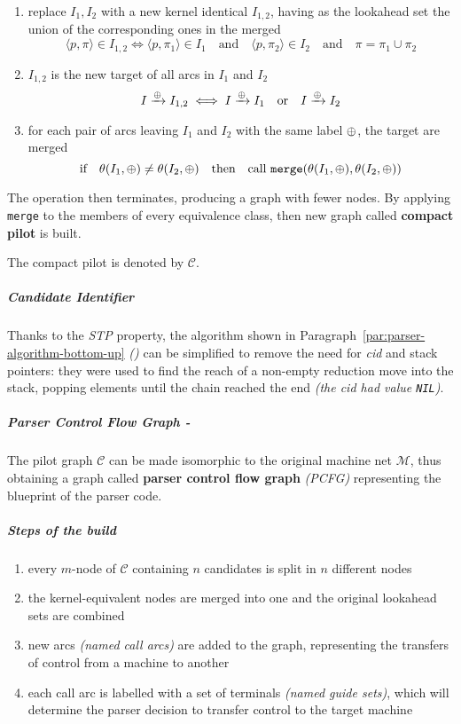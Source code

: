 \documentclass[english]{article}
\begin{document}
\begin{enumerate}
  \item replace \mstates \(I_1, I_2\) with a new kernel identical \mstate \(I_{1,2}\), having as the lookahead set the union of the corresponding ones in the merged \mstates
        \[ \langle p, \pi \rangle \in I_{1, 2} \iff \langle p, \pi_1 \rangle \in I_1 \quad \text{and} \quad \langle p, \pi_2 \rangle \in I_2 \quad \text{and} \quad \pi = \pi_1 \cup \pi_2 \]
  \item \mstate \(I_{1,2}\) is the new target of all arcs in \(I_1\) and \(I_2\)
        \[ I \xrightarrow{\oplus} I_{1,2} \iff I \xrightarrow{\oplus} I_1 \quad \text{or} \quad I \xrightarrow{\oplus} I_2 \]
  \item for each pair of arcs leaving \(I_1\) and \(I_2\) with the same label \(\oplus\), the target \mstates are merged
        \[ \text{if} \quad \theta(I_1, \oplus) \neq \theta(I_2, \oplus) \quad \text{then} \quad \text{call} \ \texttt{merge}(\theta(I_1, \oplus), \theta(I_2, \oplus)) \]
\end{enumerate}

The operation then terminates, producing a graph with fewer nodes.
By applying \texttt{merge} to the members of every equivalence class, then new graph called \textbf{compact pilot} is built.

The compact pilot is denoted by \(\mathcal{C}\).

\subparagraph*{Candidate Identifier}

Thanks to the \textit{STP} property, the algorithm shown in Paragraph~\ref{par:parser-algorithm-bottom-up} \textit{()} can be simplified to remove the need for \textit{cid} and stack pointers:
they were used to find the reach of a non-empty reduction move into the stack, popping elements until the chain reached the end \textit{(the \textit{cid} had value \texttt{NIL})}.

\subparagraph*{Parser Control Flow Graph - \PCFG}

The pilot graph \(\mathcal{C}\) can be made isomorphic to the original machine net \(\mathcal{M}\), thus obtaining a graph called \textbf{parser control flow graph} \textit{(PCFG)} representing the blueprint of the parser code.

\subparagraph*{Steps of the build}

\begin{enumerate}
  \item every \(m\)-node of \(\mathcal{C}\) containing \(n\) candidates is split in \(n\) different nodes
  \item the kernel-equivalent nodes are merged into one and the original lookahead sets are combined
  \item new arcs \textit{(named call arcs)} are added to the graph, representing the transfers of control from a machine to another
  \item each call arc is labelled with a set of terminals \textit{(named guide sets)}, which will determine the parser decision to transfer control to the target machine
\end{enumerate}
\end{document}
